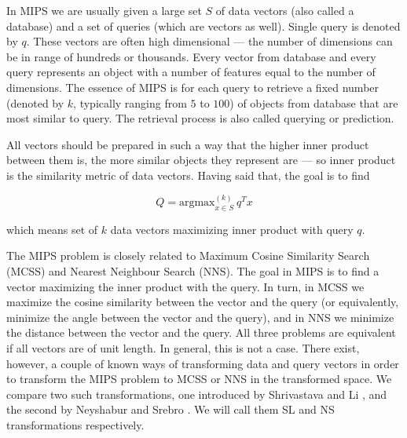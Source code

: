In MIPS we are usually given a large set $S$ of data vectors (also called a database) and a set of queries
(which are vectors as well). Single query is denoted by $q$.
These vectors are often high dimensional --- the number of dimensions can be in range of hundreds or thousands.
Every vector from database and every query represents an object with a number of features equal to the number of dimensions.
The essence of MIPS is for each query to retrieve a fixed number (denoted by $k$, typically ranging
from $5$ to $100$)
of objects from database that are most similar to query.
The retrieval process is also called querying or prediction.

All vectors should be prepared in such a way that the higher inner product between them is, 
the more similar objects they represent are
 --- so inner product is the similarity metric of data vectors. 
Having said that, the goal is to find

$$ Q = \text{argmax}_{x \in S}^{(k)} \ q^T x $$

which means set of $k$ data vectors maximizing inner product with query $q$.

The MIPS problem is closely related to Maximum Cosine
Similarity Search (MCSS) and Nearest Neighbour Search (NNS).
The goal in MIPS is to find a vector maximizing the inner product with the query. In turn, 
in MCSS we maximize the cosine similarity between the vector and the query (or equivalently,
minimize the angle between the vector and the query), and in NNS we minimize the distance between the vector and the query. All three problems are
equivalent if all vectors are of unit length. In general, this is not a case.
There exist, however, a couple of known ways
of transforming data and query vectors in order to transform the MIPS problem to MCSS or NNS in the transformed space. We compare two such 
transformations, one introduced by Shrivastava and Li \cite{alsh}, and the second by
Neyshabur and Srebro \cite{neyshabur}.
We will call them SL and NS transformations respectively.

